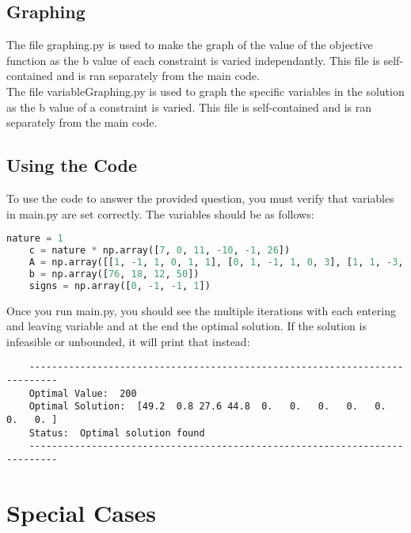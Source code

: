 \documentclass{article}
\numberwithin{equation}{section}
\begin{document}
\subsection{Graphing}
The file graphing.py is used to make the graph of the value of the objective function as the b value of each constraint is varied independantly. This file is self-contained and is ran separately from the main code.\\
The file variableGraphing.py is used to graph the specific variables in the solution as the b value of a constraint is varied. This file is self-contained and is ran separately from the main code.

\subsection{Using the Code}
To use the code to answer the provided question, you must verify that variables in main.py are set correctly. The variables should be as follows:
\begin{lstlisting}[language=Python, basicstyle=\scriptsize, frame=single]
    nature = 1
    c = nature * np.array([7, 0, 11, -10, -1, 26])
    A = np.array([[1, -1, 1, 0, 1, 1], [0, 1, -1, 1, 0, 3], [1, 1, -3, 1, 1, 0], [1, 1, 0, 0, 0, 1]])
    b = np.array([76, 18, 12, 50])
    signs = np.array([0, -1, -1, 1])
\end{lstlisting}
Once you run main.py, you should see the multiple iterations with each entering and leaving variable and at the end the optimal solution. If the solution is infeasible or unbounded, it will print that instead:
\begin{lstlisting}
    ---------------------------------------------------------------------------
    Optimal Value:  200
    Optimal Solution:  [49.2  0.8 27.6 44.8  0.   0.   0.   0.   0.   0.   0. ]
    Status:  Optimal solution found
    ---------------------------------------------------------------------------
\end{lstlisting}

\newpage
\section{Special Cases}
\end{document}

